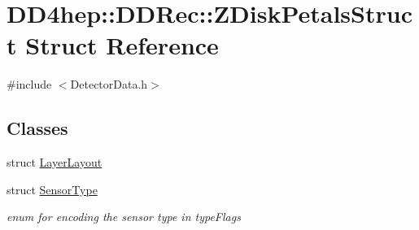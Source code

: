 \hypertarget{struct_d_d4hep_1_1_d_d_rec_1_1_z_disk_petals_struct}{}\section{D\+D4hep\+:\+:D\+D\+Rec\+:\+:Z\+Disk\+Petals\+Struct Struct Reference}
\label{struct_d_d4hep_1_1_d_d_rec_1_1_z_disk_petals_struct}


{\ttfamily \#include $<$Detector\+Data.\+h$>$}

\subsection*{Classes}
\begin{DoxyCompactItemize}
\item 
struct \hyperlink{struct_d_d4hep_1_1_d_d_rec_1_1_z_disk_petals_struct_1_1_layer_layout}{Layer\+Layout}
\item 
struct \hyperlink{struct_d_d4hep_1_1_d_d_rec_1_1_z_disk_petals_struct_1_1_sensor_type}{Sensor\+Type}
\begin{DoxyCompactList}\small\item\em enum for encoding the sensor type in type\+Flags \end{DoxyCompactList}\end{DoxyCompactItemize}
